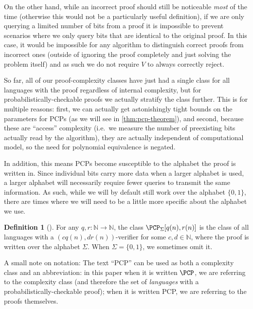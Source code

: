 \documentclass[english,12pt]{reedthesis}
\theoremstyle{plain}
\theoremstyle{definition}
\newtheorem{defn}[defn]{Definition}
\theoremstyle{remark}
\begin{document}
On the other hand, while an incorrect proof should still be noticeable
\emph{most} of the time (otherwise this would not be a particularly useful
definition), if we are only querying a limited number of bits from a proof it is
impossible to prevent scenarios where we only query bits that are identical to
the original proof. In this case, it would be impossible for any algorithm to
distinguish correct proofs from incorrect ones (outside of ignoring the proof
completely and just solving the problem itself) and as such we do not require
$V$ to always correctly reject.

So far, all of our proof-complexity classes have just had a single class for all
languages with the proof regardless of internal complexity, but for
probabilistically-checkable proofs we actually stratify the class further. This
is for multiple reasons: first, we can actually get astonishingly tight bounds
on the parameters for PCPs (as we will see in \cref{thm:pcp-theorem}), and
second, because these are ``access'' complexity (i.e.\ we measure the number of
preexisting bits actually read by the algorithm), they are actually independent
of computational model, so the need for polynomial equivalence is negated.

In addition, this means PCPs become susceptible to the alphabet the proof is
written in. Since individual bits carry more data when a larger alphabet is
used, a larger alphabet will necessarily require fewer queries to transmit the
same information. As such, while we will by default still work over the alphabet
$\{0, 1\}$, there are times where we will need to be a little more specific
about the alphabet we use.

\begin{defn}[{\cite[Def.\ 18.1]{AB09}}]\label{def:pcp}
  For any $q, r\colon \mathbb{N} \rightarrow \mathbb{N}$, the class $\PCP_{\Sigma}[q(n), r(n)]$ is the class of all
  languages with a $(cq(n), dr(n))$-verifier for some $c, d \in \mathbb{N}$, where the
  proof is written over the alphabet $\Sigma$. When $\Sigma = \{0, 1\}$, we sometimes omit
  it.
\end{defn}

A small note on notation: The text ``PCP'' can be used as both a complexity
class and an abbreviation: in this paper when it is written $\PCP$, we are
referring to the complexity class (and therefore the set of \emph{languages}
with a probabilistically-checkable proof); when it is written PCP, we are
referring to the proofs themselves.
\end{document}
